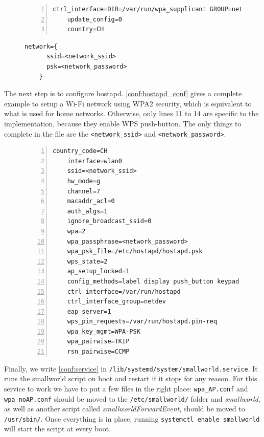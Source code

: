 \documentclass[a4paper,11pt,oneside]{report}
\begin{document}
\begin{figure}
\begin{lstlisting}[label=conf:wpa_supplicant, caption=Base WPA Supplicant configuration file, numbers=left]
    ctrl_interface=DIR=/var/run/wpa_supplicant GROUP=netdev
    update_config=0
    country=CH
\end{lstlisting}
\centering
\end{figure}

\begin{figure}
\begin{lstlisting}[label=conf:network_template, caption=Home network configuration template]
    network={
      ssid=<network_ssid>
      psk=<network_password>
    }
\end{lstlisting}
\end{figure}

The next step is to configure hostapd. \autoref{conf:hostapd_conf} gives a complete example to setup a Wi-Fi network using WPA2 security, which is equivalent to what is used for home networks. Otherwise, only lines 11 to 14 are specific to the implementation, because they enable WPS push-button. The only things to complete in the file are the \verb|<network_ssid>| and \verb|<network_password>|.

\begin{figure}
\begin{lstlisting}[label=conf:hostapd_conf, caption=Complete Access Point configuration, numbers=left]
    country_code=CH
    interface=wlan0
    ssid=<network_ssid>
    hw_mode=g
    channel=7
    macaddr_acl=0
    auth_algs=1
    ignore_broadcast_ssid=0
    wpa=2
    wpa_passphrase=<network_password>
    wpa_psk_file=/etc/hostapd/hostapd.psk
    wps_state=2
    ap_setup_locked=1
    config_methods=label display push_button keypad
    ctrl_interface=/var/run/hostapd
    ctrl_interface_group=netdev
    eap_server=1
    wps_pin_requests=/var/run/hostapd.pin-req
    wpa_key_mgmt=WPA-PSK
    wpa_pairwise=TKIP
    rsn_pairwise=CCMP
\end{lstlisting}
\end{figure}

Finally, we write \autoref{conf:service} in \verb|/lib/systemd/system/smallworld.service|. It runs the smallworld script on boot and restart if it stops for any reason. For this service to work we have to put a few files in the right place: \verb|wpa_AP.conf| and \verb|wpa_noAP.conf| should be moved to the \verb|/etc/smallworld/| folder and \emph{smallworld}, as well as another script called \emph{smallworldForwardEvent}, should be moved to \verb|/usr/sbin/|. Once everything is in place, running \verb|systemctl enable smallworld| will start the script at every boot.
\end{document}
